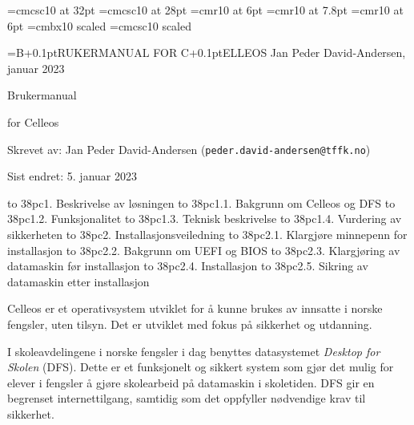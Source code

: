 



\font\ftitteltop=cmcsc10 at 32pt
\font\ftittelbottom=cmcsc10 at 28pt
\font\ftopptekst=cmr10 at 6pt
\font\ftopptekststor=cmr10 at 7.8pt
\font\fforfatter=cmr10 at 6pt
\font\fs=cmbx10 scaled
\font\fss=cmcsc10 scaled

\headline={\ftopptekststor B\kern+0.1pt{\ftopptekst RUKERMANUAL FOR } C\kern+0.1pt{\ftopptekst ELLEOS \hfill Jan Peder David-Andersen, januar 2023}}

\topglue 6pc
\centerline{\ftitteltop Brukermanual}
\vskip 10pt
\centerline{\ftittelbottom for Celleos}
\vskip 8pc

\noindent Skrevet av: Jan Peder David-Andersen ({\tt peder.david-andersen@tffk.no})

\noindent Sist endret: 5. januar 2023

\vskip 3pc
\def\tocwidth{38pc}



\hbox to \tocwidth{1. Beskrivelse av l\o sningen }
\smallskip
\hbox to \tocwidth{1.1. Bakgrunn om Celleos og DFS }
\hbox to \tocwidth{1.2. Funksjonalitet }
\hbox to \tocwidth{1.3. Teknisk beskrivelse }
\hbox to \tocwidth{1.4. Vurdering av sikkerheten }
\medskip
\hbox to \tocwidth{2. Installasjonsveiledning }
\smallskip
\hbox to \tocwidth{2.1. Klargj\o re minnepenn for installasjon }
\hbox to \tocwidth{2.2. Bakgrunn om UEFI og BIOS }
\hbox to \tocwidth{2.3. Klargj\o ring av datamaskin f\o r installasjon }
\hbox to \tocwidth{2.4. Installasjon }
\hbox to \tocwidth{2.5. Sikring av datamaskin etter installasjon }

\vfill\eject

\topglue 1pc

Celleos er et operativsystem utviklet for \aa{} kunne brukes av innsatte i norske fengsler, uten tilsyn. Det er utviklet med fokus p\aa{} sikkerhet og utdanning.



I skoleavdelingene i norske fengsler i dag benyttes datasystemet {\it Desktop for Skolen} (DFS). Dette er et funksjonelt og sikkert system som gj\o r det mulig for elever i fengsler \aa{} gj\o re skolearbeid p\aa{} datamaskin i skoletiden. DFS gir en begrenset internettilgang, samtidig som det oppfyller n\o dvendige krav til sikkerhet.

